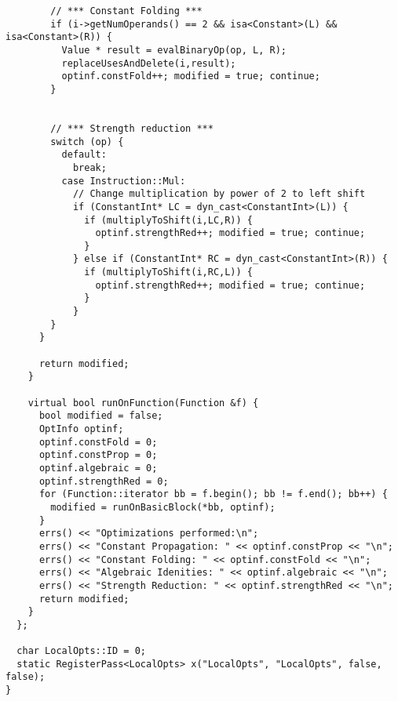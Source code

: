 \documentclass[12pt]{article}
\begin{document}
\begin{verbatim}
        // *** Constant Folding ***
        if (i->getNumOperands() == 2 && isa<Constant>(L) && isa<Constant>(R)) {
          Value * result = evalBinaryOp(op, L, R);
          replaceUsesAndDelete(i,result);
          optinf.constFold++; modified = true; continue;
        }


        // *** Strength reduction ***
        switch (op) {
          default:
            break;
          case Instruction::Mul:
            // Change multiplication by power of 2 to left shift
            if (ConstantInt* LC = dyn_cast<ConstantInt>(L)) {
              if (multiplyToShift(i,LC,R)) {
                optinf.strengthRed++; modified = true; continue;
              }
            } else if (ConstantInt* RC = dyn_cast<ConstantInt>(R)) {
              if (multiplyToShift(i,RC,L)) {
                optinf.strengthRed++; modified = true; continue;
              }
            }
        }
      }

      return modified;
    }

    virtual bool runOnFunction(Function &f) {
      bool modified = false;
      OptInfo optinf;
      optinf.constFold = 0;
      optinf.constProp = 0;
      optinf.algebraic = 0;
      optinf.strengthRed = 0;
      for (Function::iterator bb = f.begin(); bb != f.end(); bb++) {
        modified = runOnBasicBlock(*bb, optinf);
      }
      errs() << "Optimizations performed:\n";
      errs() << "Constant Propagation: " << optinf.constProp << "\n";
      errs() << "Constant Folding: " << optinf.constFold << "\n";
      errs() << "Algebraic Idenities: " << optinf.algebraic << "\n";
      errs() << "Strength Reduction: " << optinf.strengthRed << "\n";
      return modified;
    }
  };

  char LocalOpts::ID = 0;
  static RegisterPass<LocalOpts> x("LocalOpts", "LocalOpts", false, false);
}
\end{verbatim}
\end{document}
